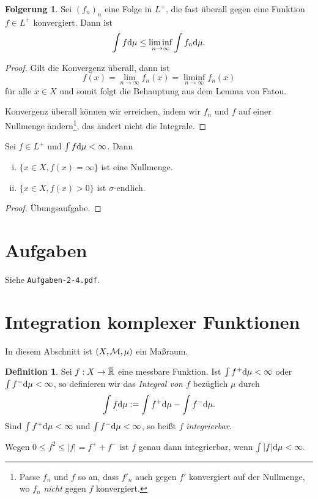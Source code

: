 \documentclass[
 a4paper,
 12pt,
 parskip=half
 ]{scrreprt}
\theoremstyle{plain}
\theoremstyle{definition}
\newtheorem{defn}[thm]{Definition}
\newtheorem{folg}[thm]{Folgerung}
\numberwithin{equation}{section}
\begin{document}
\begin{folg}
 Sei $(f_n)_n$ eine Folge in $L^+$, die fast überall gegen eine Funktion $f \in L^+$ konvergiert. Dann ist
 \[ \int f \mathrm{d} \mu \le \liminf_{n \to \infty} \int f_n \mathrm{d} \mu. \]
\end{folg}

\begin{proof}
 Gilt die Konvergenz überall, dann ist
 \[ f(x) = \lim_{n \to \infty} f_n(x) = \liminf_{n \to \infty} f_n(x) \]
 für alle $x \in X$ und somit folgt die Behauptung aus dem Lemma von Fatou. 
 
 Konvergenz überall können wir erreichen, indem wir $f_n$ und $f$ auf einer Nullmenge ändern\footnote{Passe $f_n$ und $f$ so an, dass $f'_n$ auch gegen $f'$ konvergiert auf der Nullmenge, wo $f_n$ \emph{nicht} gegen $f$ konvergiert.}, das ändert nicht die Integrale.
\end{proof}

\begin{lem}
 Sei $f \in L^+$ und $\int f \mathrm{d} \mu < \infty$. Dann
 \begin{enumerate}[(i)]
  \item $\{ x \in X,  f(x) = \infty \}$ ist eine Nullmenge.
  \item $\{ x \in X, f(x) > 0 \}$ ist $\sigma$-endlich.
 \end{enumerate}
\end{lem}

\begin{proof}
 Übungsaufgabe.
\end{proof}

\section{Aufgaben}
Siehe \verb+Aufgaben-2-4.pdf+.

\section{Integration komplexer Funktionen}
In diesem Abschnitt ist $(X, \mathcal{M}, \mu)$ ein Maßraum.

\begin{defn}
 Sei $f:X \to \realext$ eine messbare Funktion. Ist $\int f^+ \mathrm{d} \mu < \infty$ oder $\int f^- \mathrm{d} \mu < \infty$, so definieren wir das \emph{Integral von $f$} bezüglich $\mu$ durch
 \[ \int f \mathrm{d} \mu := \int f^+ \mathrm{d} \mu - \int f^- \mathrm{d} \mu. \]
 Sind $\int f^+ \mathrm{d} \mu < \infty$ und $\int f^- \mathrm{d} \mu < \infty$, so heißt $f$ \emph{integrierbar}. 
 
 Wegen $0 \le f^2 \le |f| = f^+ + f^-$ ist $f$ genau dann integrierbar, wenn $\int |f| \mathrm{d} \mu < \infty.$
\end{defn}
\end{document}
